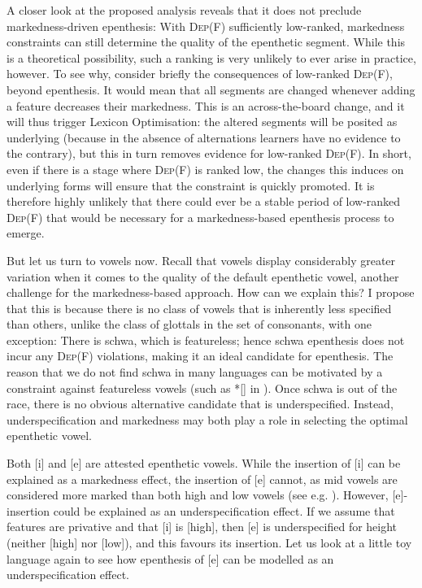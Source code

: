 \documentclass[output=paper,colorlinks,citecolor=brown]{langscibook}
\begin{document}
A closer look at the proposed analysis reveals that it does not preclude marked\-ness-driven epenthesis: With \textsc{Dep}(F) sufficiently low-ranked, markedness constraints can still determine the quality of the epenthetic segment. While this is a theoretical possibility, such a ranking is very unlikely to ever arise in practice, however. To see why, consider briefly the consequences of low-ranked \textsc{Dep}(F), beyond epenthesis. It would mean that all segments are changed whenever adding a feature decreases their markedness. This is an across-the-board change, and it will thus trigger Lexicon Optimisation: the altered segments will be posited as underlying (because in the absence of alternations learners have no evidence to the contrary), but this in turn removes evidence for low-ranked \textsc{Dep}(F). In short, even if there is a stage where \textsc{Dep}(F) is ranked low, the changes this induces on underlying forms will ensure that the constraint is quickly promoted. It is therefore highly unlikely that there could ever be a stable period of low-ranked \textsc{Dep}(F) that would be necessary for a markedness-based epenthesis process to emerge.

But let us turn to vowels now. Recall that vowels display considerably greater variation when it comes to the quality of the default epenthetic vowel, another challenge for the markedness-based approach. How can we explain this? I propose that this is because there is no class of vowels that is inherently less specified than others, unlike the class of glottals in the set of consonants, with one exception: There is schwa, which is featureless; hence schwa epenthesis does not incur any \textsc{Dep}(F) violations, making it an ideal candidate for epenthesis. The reason that we do not find schwa in many languages can be motivated by a constraint against featureless vowels (such as *[] in \citealt{jjm18}). Once schwa is out of the race, there is no obvious alternative candidate that is underspecified. Instead, underspecification and markedness may both play a role in selecting the optimal epenthetic vowel.

Both [i] and [e] are attested epenthetic vowels. While the insertion of [i] can be explained as a markedness effect, the insertion of [e] cannot, as mid vowels are considered more marked than both high and low vowels (see e.g. \citealt{lombardi03}). However, [e]-insertion could be explained as an underspecification effect. If we assume that features are privative and that [i] is [high], then [e] is underspecified for height (neither [high] nor [low]), and this favours its insertion. Let us look at a little toy language again to see how epenthesis of [e] can be modelled as an underspecification effect.
\end{document}
